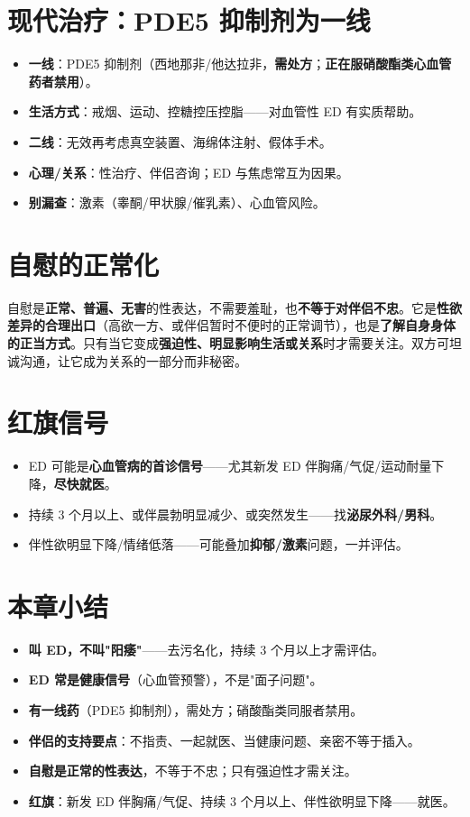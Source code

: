 \documentclass[12pt,UTF8,openany]{ctexbook}
\begin{document}
\section{现代治疗：PDE5 抑制剂为一线}
\begin{itemize}[leftmargin=2em,itemsep=0.3em]
  \item \textbf{一线}：PDE5 抑制剂（西地那非/他达拉非，\textbf{需处方}；\textbf{正在服硝酸酯类心血管药者禁用}）。
  \item \textbf{生活方式}：戒烟、运动、控糖控压控脂——对血管性 ED 有实质帮助。
  \item \textbf{二线}：无效再考虑真空装置、海绵体注射、假体手术。
  \item \textbf{心理/关系}：性治疗、伴侣咨询；ED 与焦虑常互为因果。
  \item \textbf{别漏查}：激素（睾酮/甲状腺/催乳素）、心血管风险。
\end{itemize}

\section{自慰的正常化}
自慰是\textbf{正常、普遍、无害}的性表达，不需要羞耻，也\textbf{不等于对伴侣不忠}。它是\textbf{性欲差异的合理出口}（高欲一方、或伴侣暂时不便时的正常调节），也是\textbf{了解自身身体的正当方式}。只有当它变成\textbf{强迫性、明显影响生活或关系}时才需要关注。双方可坦诚沟通，让它成为关系的一部分而非秘密。

\section{红旗信号}
\begin{itemize}[leftmargin=2em,itemsep=0.3em]
  \item ED 可能是\textbf{心血管病的首诊信号}——尤其新发 ED 伴胸痛/气促/运动耐量下降，\textbf{尽快就医}。
  \item 持续 3 个月以上、或伴晨勃明显减少、或突然发生——找\textbf{泌尿外科/男科}。
  \item 伴性欲明显下降/情绪低落——可能叠加\textbf{抑郁/激素}问题，一并评估。
\end{itemize}

\section{本章小结}
\begin{itemize}[leftmargin=2em,itemsep=0.3em]
  \item \textbf{叫 ED，不叫"阳痿"}——去污名化，持续 3 个月以上才需评估。
  \item \textbf{ED 常是健康信号}（心血管预警），不是"面子问题"。
  \item \textbf{有一线药}（PDE5 抑制剂），需处方；硝酸酯类同服者禁用。
  \item \textbf{伴侣的支持要点}：不指责、一起就医、当健康问题、亲密不等于插入。
  \item \textbf{自慰是正常的性表达}，不等于不忠；只有强迫性才需关注。
  \item \textbf{红旗}：新发 ED 伴胸痛/气促、持续 3 个月以上、伴性欲明显下降——就医。
\end{itemize}
\end{document}
